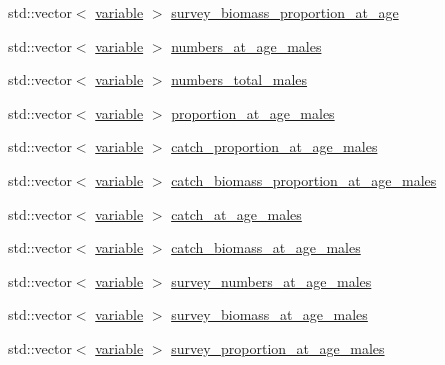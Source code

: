 \begin{DoxyCompactItemize}
\item 
std\-::vector$<$ \hyperlink{structmas_1_1_area_a3fb53ebc27c5323de15a81fbfbc7c878}{variable} $>$ \hyperlink{structmas_1_1_area_a73ef63706809741b03510ccdf85c5c8b}{survey\-\_\-biomass\-\_\-proportion\-\_\-at\-\_\-age}
\item 
std\-::vector$<$ \hyperlink{structmas_1_1_area_a3fb53ebc27c5323de15a81fbfbc7c878}{variable} $>$ \hyperlink{structmas_1_1_area_abd69833d78a921fd8c8b13140e46ad06}{numbers\-\_\-at\-\_\-age\-\_\-males}
\item 
std\-::vector$<$ \hyperlink{structmas_1_1_area_a3fb53ebc27c5323de15a81fbfbc7c878}{variable} $>$ \hyperlink{structmas_1_1_area_a8c1682e2c1ac46f6b6be45c68bc999c8}{numbers\-\_\-total\-\_\-males}
\item 
std\-::vector$<$ \hyperlink{structmas_1_1_area_a3fb53ebc27c5323de15a81fbfbc7c878}{variable} $>$ \hyperlink{structmas_1_1_area_ab5ddd76246ce29807ff2143e858b4907}{proportion\-\_\-at\-\_\-age\-\_\-males}
\item 
std\-::vector$<$ \hyperlink{structmas_1_1_area_a3fb53ebc27c5323de15a81fbfbc7c878}{variable} $>$ \hyperlink{structmas_1_1_area_a4c7e17b198774676569c7ab30987fee6}{catch\-\_\-proportion\-\_\-at\-\_\-age\-\_\-males}
\item 
std\-::vector$<$ \hyperlink{structmas_1_1_area_a3fb53ebc27c5323de15a81fbfbc7c878}{variable} $>$ \hyperlink{structmas_1_1_area_aea1735e78135761b1308da0eaf619338}{catch\-\_\-biomass\-\_\-proportion\-\_\-at\-\_\-age\-\_\-males}
\item 
std\-::vector$<$ \hyperlink{structmas_1_1_area_a3fb53ebc27c5323de15a81fbfbc7c878}{variable} $>$ \hyperlink{structmas_1_1_area_a3e226c7a59b5840c37917d492ea0b958}{catch\-\_\-at\-\_\-age\-\_\-males}
\item 
std\-::vector$<$ \hyperlink{structmas_1_1_area_a3fb53ebc27c5323de15a81fbfbc7c878}{variable} $>$ \hyperlink{structmas_1_1_area_a029e7f2d0fccc9acf8e2d5767644d1fa}{catch\-\_\-biomass\-\_\-at\-\_\-age\-\_\-males}
\item 
std\-::vector$<$ \hyperlink{structmas_1_1_area_a3fb53ebc27c5323de15a81fbfbc7c878}{variable} $>$ \hyperlink{structmas_1_1_area_ae6160129e74d4b173cb755976835d162}{survey\-\_\-numbers\-\_\-at\-\_\-age\-\_\-males}
\item 
std\-::vector$<$ \hyperlink{structmas_1_1_area_a3fb53ebc27c5323de15a81fbfbc7c878}{variable} $>$ \hyperlink{structmas_1_1_area_a5ece3cad1dd8083d91747c5aa81b1193}{survey\-\_\-biomass\-\_\-at\-\_\-age\-\_\-males}
\item 
std\-::vector$<$ \hyperlink{structmas_1_1_area_a3fb53ebc27c5323de15a81fbfbc7c878}{variable} $>$ \hyperlink{structmas_1_1_area_ab2207ba2c622fe615b415efa69df5f84}{survey\-\_\-proportion\-\_\-at\-\_\-age\-\_\-males}

\end{DoxyCompactItemize}
